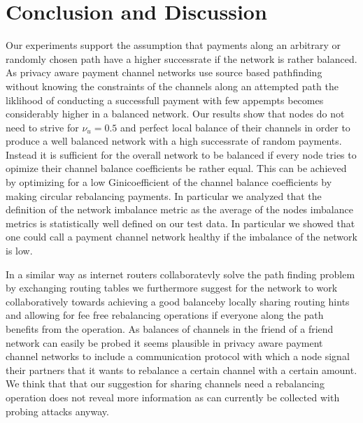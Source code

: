 \documentclass[a4paper]{paper}
\begin{document}
\section{Conclusion and Discussion}\label{sec:conclusion}
Our experiments support the assumption that payments along an arbitrary or randomly chosen path have a higher successrate if the network is rather balanced.
As privacy aware payment channel networks use source based pathfinding without knowing the constraints of the channels along an attempted path the liklihood of conducting a successfull payment with few appempts becomes considerably higher in a balanced network.
Our results show that nodes do not need to strive for $\nu_u = 0.5$ and perfect local balance of their channels in order to produce a well balanced network with a high successrate of random payments.
Instead it is sufficient for the overall network to be balanced if every node tries to opimize their channel balance coefficients be rather equal. 
This can be achieved by optimizing for a low Ginicoefficient of the channel balance coefficients by making circular rebalancing payments.
In particular we analyzed that the definition of the network imbalance metric as the average of the nodes imbalance metrics is statistically well defined on our test data.
In particular we showed that one could call a payment channel network healthy if the imbalance of the network is low.

In a similar way as internet routers collaboratevly solve the path finding problem by exchanging routing tables we furthermore suggest for the network to work collaboratively towards achieving a good balanceby locally sharing routing hints and allowing for fee free rebalancing operations if everyone along the path benefits from the operation. 
As balances of channels in the friend of a friend network can easily be probed it seems plausible in privacy aware payment channel networks to include a communication protocol with which a node signal their partners that it wants to rebalance a certain channel with a certain amount.
We think that that our suggestion for sharing channels need a rebalancing operation does not reveal more information as can currently be collected with probing attacks anyway.
\end{document}

